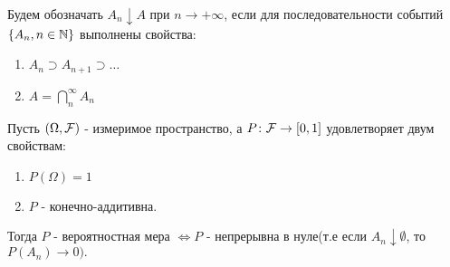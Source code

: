 \begin{definition}
	Будем обозначать $A_n \downarrow A$ при $n \to +\infty $, 
	если для последовательности событий $\left\{ A_n, n \in \mathbb{N} \right\}$ выполнены свойства: 

	\begin{enumerate}
		\item $A_n \supset A_{n+1} \supset \ldots$
		\item $A = \bigcap\limits_{n}^{\infty} A_n$
	\end{enumerate}
\end{definition}

\begin{theorem}
	Пусть $(\Omega, \mathcal{F})$ - измеримое пространство, 
	а $P\colon \mathcal{F} \rightarrow [0, 1]$ удовлетворяет двум свойствам:
	\begin{enumerate}
		\item $P(\Omega) = 1$
		\item $P$ - конечно-аддитивна. 
	\end{enumerate}
	Тогда $P$ - вероятностная мера $\iff P$ - непрерывна в нуле(т.е если $A_n  \downarrow \emptyset$, то $P(A_n) \rightarrow 0).$
\end{theorem}

